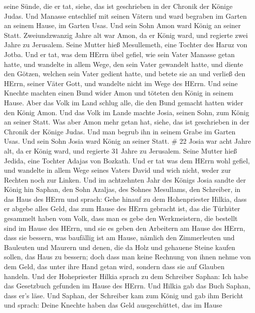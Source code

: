 seine Sünde, die er tat, siehe, das ist geschrieben in der Chronik der
Könige Judas.  Und Manasse entschlief mit seinen Vätern und
ward begraben im Garten an seinem Hause, im Garten Usas. Und sein Sohn
Amon ward König an seiner Statt.  Zweiundzwanzig Jahre alt
war Amon, da er König ward, und regierte zwei Jahre zu Jerusalem. Seine
Mutter hieß Mesullemeth, eine Tochter des Haruz von Jotba. 
Und er tat, was dem HErrn übel gefiel, wie sein Vater Manasse getan
hatte,  und wandelte in allem Wege, den sein Vater
gewandelt hatte, und diente den Götzen, welchen sein Vater gedient
hatte, und betete sie an  und verließ den HErrn, seiner
Väter Gott, und wandelte nicht im Wege des HErrn.  Und
seine Knechte machten einen Bund wider Amon und töteten den König in
seinem Hause.  Aber das Volk im Land schlug alle, die den
Bund gemacht hatten wider den König Amon. Und das Volk im Lande machte
Josia, seinen Sohn, zum König an seiner Statt.  Was aber
Amon mehr getan hat, siehe, das ist geschrieben in der Chronik der
Könige Judas.  Und man begrub ihn in seinem Grabe im Garten
Usas. Und sein Sohn Josia ward König an seiner Statt. \# 22 
Josia war acht Jahre alt, da er König ward, und regierte 31 Jahre zu
Jerusalem. Seine Mutter hieß Jedida, eine Tochter Adajas von Bozkath.
 Und er tat was dem HErrn wohl gefiel, und wandelte in allem
Wege seines Vaters David und wich nicht, weder zur Rechten noch zur
Linken.  Und im achtzehnten Jahr des Königs Josia sandte der
König hin Saphan, den Sohn Azaljas, des Sohnes Mesullams, den Schreiber,
in das Haus des HErrn und sprach:  Gehe hinauf zu dem
Hohenpriester Hilkia, dass er abgebe alles Geld, das zum Hause des HErrn
gebracht ist, das die Türhüter gesammelt haben vom Volk, 
dass man es gebe den Werkmeistern, die bestellt sind im Hause des HErrn,
und sie es geben den Arbeitern am Hause des HErrn, dass sie bessern, was
baufällig ist am Hause,  nämlich den Zimmerleuten und
Bauleuten und Maurern und denen, die da Holz und gehauene Steine kaufen
sollen, das Haus zu bessern;  doch dass man keine Rechnung
von ihnen nehme von dem Geld, das unter ihre Hand getan wird, sondern
dass sie auf Glauben handeln.  Und der Hohepriester Hilkia
sprach zu dem Schreiber Saphan: Ich habe das Gesetzbuch gefunden im
Hause des HErrn. Und Hilkia gab das Buch Saphan, dass er's läse.
 Und Saphan, der Schreiber kam zum König und gab ihm Bericht
und sprach: Deine Knechte haben das Geld ausgeschüttet, das im Hause
